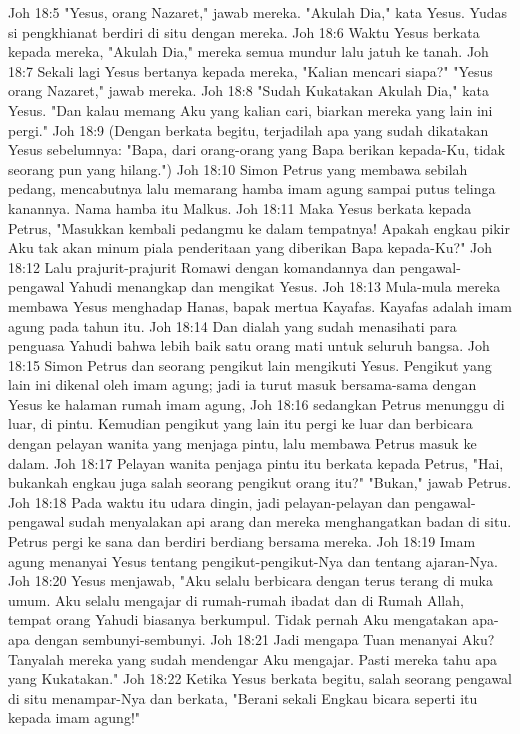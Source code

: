 Joh 18:5  "Yesus, orang Nazaret," jawab mereka. "Akulah Dia," kata Yesus. Yudas si pengkhianat berdiri di situ dengan mereka.
Joh 18:6  Waktu Yesus berkata kepada mereka, "Akulah Dia," mereka semua mundur lalu jatuh ke tanah.
Joh 18:7  Sekali lagi Yesus bertanya kepada mereka, "Kalian mencari siapa?" "Yesus orang Nazaret," jawab mereka.
Joh 18:8  "Sudah Kukatakan Akulah Dia," kata Yesus. "Dan kalau memang Aku yang kalian cari, biarkan mereka yang lain ini pergi."
Joh 18:9  (Dengan berkata begitu, terjadilah apa yang sudah dikatakan Yesus sebelumnya: "Bapa, dari orang-orang yang Bapa berikan kepada-Ku, tidak seorang pun yang hilang.")
Joh 18:10  Simon Petrus yang membawa sebilah pedang, mencabutnya lalu memarang hamba imam agung sampai putus telinga kanannya. Nama hamba itu Malkus.
Joh 18:11  Maka Yesus berkata kepada Petrus, "Masukkan kembali pedangmu ke dalam tempatnya! Apakah engkau pikir Aku tak akan minum piala penderitaan yang diberikan Bapa kepada-Ku?"
Joh 18:12  Lalu prajurit-prajurit Romawi dengan komandannya dan pengawal-pengawal Yahudi menangkap dan mengikat Yesus.
Joh 18:13  Mula-mula mereka membawa Yesus menghadap Hanas, bapak mertua Kayafas. Kayafas adalah imam agung pada tahun itu.
Joh 18:14  Dan dialah yang sudah menasihati para penguasa Yahudi bahwa lebih baik satu orang mati untuk seluruh bangsa.
Joh 18:15  Simon Petrus dan seorang pengikut lain mengikuti Yesus. Pengikut yang lain ini dikenal oleh imam agung; jadi ia turut masuk bersama-sama dengan Yesus ke halaman rumah imam agung,
Joh 18:16  sedangkan Petrus menunggu di luar, di pintu. Kemudian pengikut yang lain itu pergi ke luar dan berbicara dengan pelayan wanita yang menjaga pintu, lalu membawa Petrus masuk ke dalam.
Joh 18:17  Pelayan wanita penjaga pintu itu berkata kepada Petrus, "Hai, bukankah engkau juga salah seorang pengikut orang itu?" "Bukan," jawab Petrus.
Joh 18:18  Pada waktu itu udara dingin, jadi pelayan-pelayan dan pengawal-pengawal sudah menyalakan api arang dan mereka menghangatkan badan di situ. Petrus pergi ke sana dan berdiri berdiang bersama mereka.
Joh 18:19  Imam agung menanyai Yesus tentang pengikut-pengikut-Nya dan tentang ajaran-Nya.
Joh 18:20  Yesus menjawab, "Aku selalu berbicara dengan terus terang di muka umum. Aku selalu mengajar di rumah-rumah ibadat dan di Rumah Allah, tempat orang Yahudi biasanya berkumpul. Tidak pernah Aku mengatakan apa-apa dengan sembunyi-sembunyi.
Joh 18:21  Jadi mengapa Tuan menanyai Aku? Tanyalah mereka yang sudah mendengar Aku mengajar. Pasti mereka tahu apa yang Kukatakan."
Joh 18:22  Ketika Yesus berkata begitu, salah seorang pengawal di situ menampar-Nya dan berkata, "Berani sekali Engkau bicara seperti itu kepada imam agung!"
